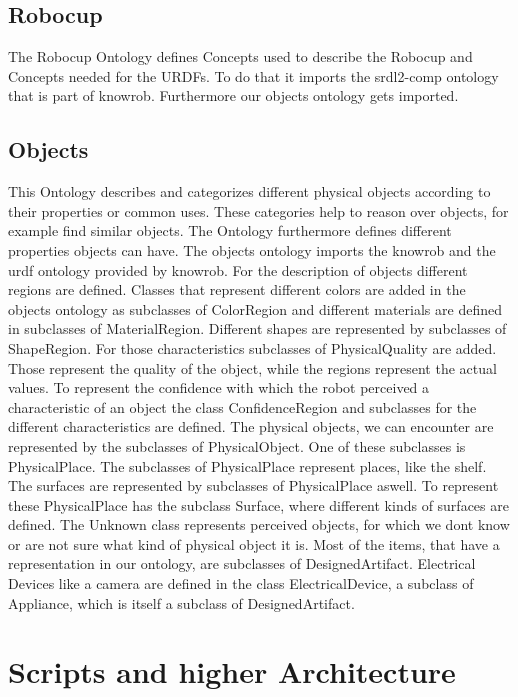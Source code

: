 \documentclass[main.tex]{subfiles}
\begin{document}
\subsection{Robocup}
The Robocup Ontology defines Concepts used to describe the Robocup and Concepts needed for the URDFs. To do that it imports the srdl2-comp ontology that is part of knowrob. Furthermore our objects ontology gets imported.




\subsection{Objects}

This Ontology describes and categorizes different physical objects according to their properties or common uses. These categories help to reason over objects, for example find similar objects. The Ontology furthermore defines different properties objects can have. 
The objects ontology imports the knowrob and the urdf ontology provided by knowrob.
For the description of objects different regions are defined. Classes that represent different colors are added in the objects ontology as subclasses of ColorRegion and different materials are defined in subclasses of MaterialRegion. Different shapes are represented by subclasses of ShapeRegion.
For those characteristics subclasses of PhysicalQuality are added. Those represent the quality of the object, while the regions represent the actual values.
To represent the confidence with which the robot perceived a characteristic of an object the class ConfidenceRegion and subclasses for the different characteristics are defined.
The physical objects, we can encounter are represented by the subclasses of PhysicalObject.
One of these subclasses is PhysicalPlace. The subclasses of PhysicalPlace represent places, like the shelf. The surfaces are represented by subclasses of PhysicalPlace aswell. To represent these PhysicalPlace has the subclass Surface, where different kinds of surfaces are defined.
The Unknown class represents perceived objects, for which we dont know or are not sure what kind of physical object it is.
Most of the items, that have a representation in our ontology, are subclasses of DesignedArtifact.
Electrical Devices like a camera are defined in the class ElectricalDevice, a subclass of Appliance, which is itself a subclass of DesignedArtifact.



\section{Scripts and higher Architecture}
\end{document}
